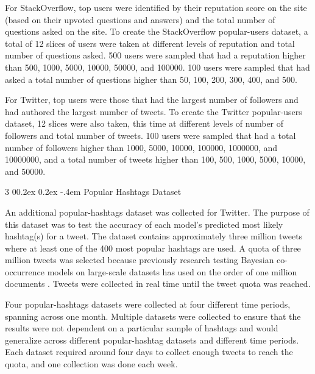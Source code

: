 \documentclass[man,floatsintext,donotrepeattitle]{apa6}
\makeatletter
\renewcommand{\subsubsection}{%
  \@startsection
  {subsubsection}%
  {3}%
  {\parindent}%
  {0\baselineskip \@plus 0.2ex \@minus 0.2ex}%
  {-.4em}%
  {\normalfont\normalsize\bfseries\addperi}}
\makeatother
\begin{document}
For StackOverflow, top users were identified by their reputation score on the site (based on their upvoted questions and answers) and the total number of questions asked on the site.
To create the StackOverflow popular-users dataset, a total of 12 slices of users were taken at different levels of reputation and total number of questions asked.
500 users were sampled that had a reputation higher than \num{500}, \num{1000}, \num{5000}, \num{10000}, \num{50000}, and \num{100000}.
100 users were sampled that had asked a total number of questions higher than \num{50}, \num{100}, \num{200}, \num{300}, \num{400}, and \num{500}.

For Twitter, top users were those that had the largest number of followers and had authored the largest number of tweets.
To create the Twitter popular-users dataset, 12 slices were also taken, this time at different levels of number of followers and total number of tweets.
100 users were sampled that had a total number of followers higher than \num{1000}, \num{5000}, \num{10000}, \num{100000}, \num{1000000}, and \num{10000000},
and a total number of tweets higher than \num{100}, \num{500}, \num{1000}, \num{5000}, \num{10000}, and \num{50000}.

\subsubsection{Popular Hashtags Dataset}

An additional popular-hashtags dataset was collected for Twitter.
The purpose of this dataset was to test the accuracy of each model's predicted most likely hashtag(s) for a tweet.
The dataset contains approximately three million tweets where at least one of the 400 most popular hashtags are used.
A quota of three million tweets was selected because previously research testing Bayesian co-occurrence models on large-scale datasets has used on the order of one million documents
\parencites{Stanley2013,Douglass2010,Budiu2007,Kuo2011}.
Tweets were collected in real time until the tweet quota was reached.

Four popular-hashtags datasets were collected at four different time periods, spanning across one month.
Multiple datasets were collected to ensure that the results were not dependent on a particular sample of hashtags and would generalize across different popular-hashtag datasets and different time periods.
Each dataset required around four days to collect enough tweets to reach the quota, and one collection was done each week.
\end{document}
